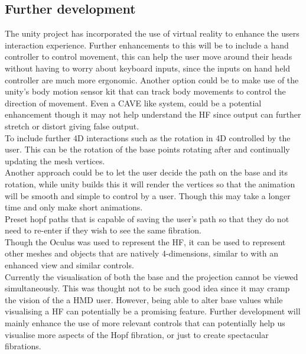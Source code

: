 \documentclass[12pt]{article} %
\begin{document}
\begin{flushleft}
\subsection{Further development} %
The unity project has incorporated the use of virtual reality to enhance the users interaction experience. Further enhancements to this will be to include a hand controller to control movement, this can help the user move around their heads without having to worry about keyboard inputs, since the inputs on hand held controller are much more ergonomic. Another option could be to make use of the unity's body motion sensor kit that can track body movements to control the direction of movement. Even a CAVE like system, could be a potential enhancement though it may not help understand the HF since output can further stretch or distort giving false output.\\
To include further 4D interactions such as the rotation in 4D controlled by the user. This can be the rotation of the base points rotating after and continually updating the mesh vertices.\\
Another approach could be to let the user decide the path on the base and its rotation, while unity builds this it will render the vertices so that the animation will be smooth and simple to control by a user. Though this may take a longer time and only make short animations.\\
Preset hopf paths that is capable of saving the user's path so that they do not need to re-enter if they wish to see the same fibration.\\
Though the Oculus was used to represent the HF, it can be used to represent other meshes and objects that are natively 4-dimensions, similar to \cite{Hanson:1999} with an enhanced view and similar controls.\\
Currently the visualisation of both the base and the projection cannot be viewed simultaneously. This was thought not to be such good idea since it may cramp the vision of the a HMD user. However, being able to alter base values while visualising a HF can potentially be a promising feature.
Further development will mainly enhance the use of more relevant controls that can potentially help us visualise more aspects of the Hopf fibration, or just to create spectacular fibrations.


\end{flushleft}
\end{document}
